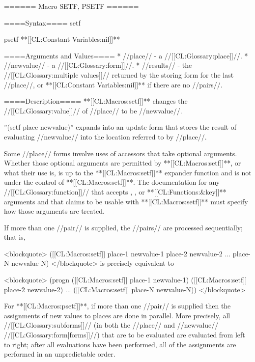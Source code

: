 ====== Macro SETF, PSETF ======

====Syntax====
\DefmacWithValues setf {} {}

\DefmacWithValues psetf {} {**[[CL:Constant Variables:nil]]**}


====Arguments and Values====
  * //place// - a //[[CL:Glossary:place]]//.
  * //newvalue// - a //[[CL:Glossary:form]]//.
  * //results// - the //[[CL:Glossary:multiple values]]// returned by the storing form for the last //place//, or **[[CL:Constant Variables:nil]]** if there are no //pairs//.

====Description====
**[[CL:Macros:setf]]** changes the //[[CL:Glossary:value]]// of //place// to be //newvalue//.

''(setf place newvalue)'' expands into an update form that stores the result of evaluating //newvalue// into the location referred to by //place//.

Some //place// forms involve uses of accessors that take optional arguments. Whether those optional arguments are permitted by **[[CL:Macros:setf]]**, or what their use is, is up to the **[[CL:Macros:setf]]** expander function and is not under the control of **[[CL:Macros:setf]]**. The documentation for any //[[CL:Glossary:function]]// that accepts , , or **[[CL:Functions:&key]]** arguments and that claims to be usable with **[[CL:Macros:setf]]** must specify how those arguments are treated.



If more than one //pair// is supplied, the //pairs// are processed sequentially; that is,

<blockquote> ([[CL:Macros:setf]] place-1 newvalue-1 place-2 newvalue-2 ... place-N newvalue-N) </blockquote> is precisely equivalent to

<blockquote> (progn ([[CL:Macros:setf]] place-1 newvalue-1) ([[CL:Macros:setf]] place-2 newvalue-2) ... ([[CL:Macros:setf]] place-N newvalue-N)) </blockquote>

For **[[CL:Macros:psetf]]**, if more than one //pair// is supplied then the assignments of new values to places are done in parallel. More precisely, all //[[CL:Glossary:subforms]]// (in both the //place// and //newvalue// //[[CL:Glossary:form|forms]]//) that are to be evaluated are evaluated from left to right; after all evaluations have been performed, all of the assignments are performed in an unpredictable order.

